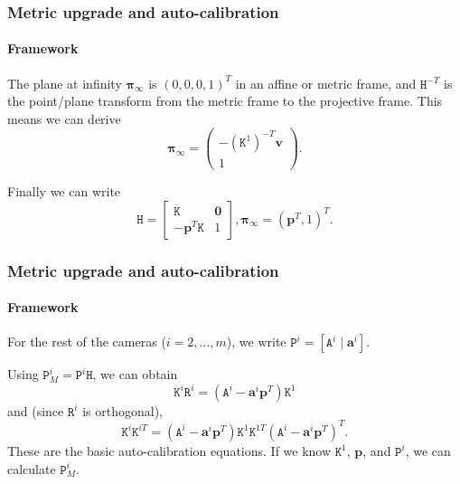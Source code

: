 \documentclass[aspectratio=169]{beamer}
\renewcommand{\vec}[1]{\boldsymbol{#1}}
\newcommand{\mat}[1]{\mathtt{#1}}
\begin{document}
\begin{frame}
\frametitle{Metric upgrade and auto-calibration}
\framesubtitle{Framework}

The plane at infinity $\vec{\pi}_{\infty}$ is $(0,0,0,1)^T$ in an affine
or metric
frame, and $\mat{H}^{-T}$ is the point/plane transform from the metric frame
to the projective frame.  This means we can derive
\begin{equation*}
\vec{\pi}_{\infty} =
\begin{pmatrix} -(\mat{K}^1)^{-T}\vec{v} \\ 1 \end{pmatrix}.
\end{equation*}

\medskip

Finally we can write
\begin{equation*}
\mat{H} =
\begin{bmatrix} \mat{K} & \vec{0} \\ -\vec{p}^T\mat{K} & 1 \end{bmatrix},
\vec{\pi}_{\infty} = (\vec{p}^T,1)^T.
\end{equation*}

\end{frame}

\begin{frame}
\frametitle{Metric upgrade and auto-calibration}
\framesubtitle{Framework}

For the rest of the cameras ($i = 2, \ldots, m$), we write
$\mat{P}^i = [\mat{A}^i \mid \vec{a}^i]$.

\medskip

Using $\mat{P}^i_M = \mat{P}^i\mat{H}$, we can obtain
    \begin{equation*}
    \mat{K}^i\mat{R}^i = (\mat{A}^i-\vec{a}^i\vec{p}^T) \mat{K}^1
    \end{equation*}
and (since $\mat{R}^i$ is orthogonal),
    \begin{equation*}
    \mat{K}^i\mat{K}^{iT} = (\mat{A}^i-\vec{a}^i\vec{p}^T)
           \mat{K}^1\mat{K}^{1T}(\mat{A}^i-\vec{a}^i\vec{p}^T)^T.
    \end{equation*}
These are the \alert{basic auto-calibration equations}.  If we know
$\mat{K}^1$, $\vec{p}$, and $\mat{P}^i$, we can calculate $\mat{P}^i_M$.

\end{frame}
\end{document}
